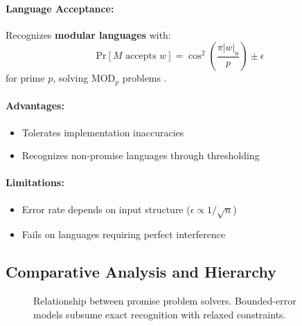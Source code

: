 \paragraph{Language Acceptance:}
Recognizes \textbf{modular languages} with:
\[
\text{Pr}[M \text{ accepts } w] = \cos^2\left(\frac{\pi |w|_a}{p}\right) \pm \epsilon
\]
for prime $p$, solving MOD$_p$ problems \cite{ambainis2002quantum}.

\paragraph{Advantages:}
\begin{itemize}
    \item Tolerates implementation inaccuracies
    \item Recognizes non-promise languages through thresholding
\end{itemize}

\paragraph{Limitations:}
\begin{itemize}
    \item Error rate depends on input structure ($\epsilon \propto 1/\sqrt{n}$)
    \item Fails on languages requiring perfect interference
\end{itemize}

\subsection*{Comparative Analysis and Hierarchy}
\begin{figure}[h]
\centering
{}
\caption{Relationship between promise problem solvers. Bounded-error models subsume exact recognition with relaxed constraints.}
\label{fig:promise-hierarchy}
\end{figure}

